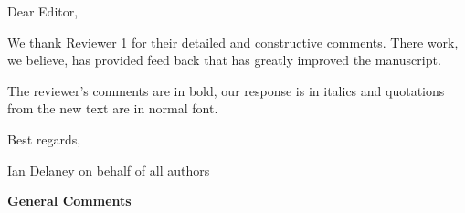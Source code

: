 \documentclass[11pt]{article}
\title{}
\author{}
\begin{document}
Dear Editor,

\vspace{.3cm}

We thank Reviewer 1 for their detailed and constructive comments. There work, we believe, has provided feed back that has greatly improved the manuscript.

The reviewer's comments are in bold, our response is in italics and quotations from the new text are in normal font.

\vspace{.3cm}

Best regards,

\vspace{.75cm}

Ian Delaney on behalf of all authors

\vspace{2cm}

\textbf{General Comments}
\end{document}
